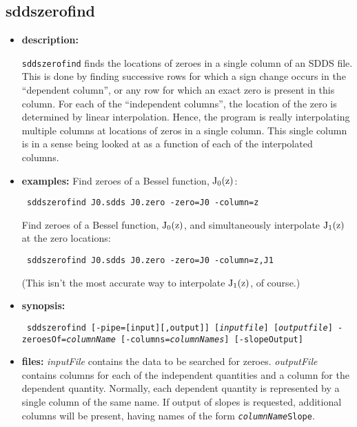 \newpage
\subsection{sddszerofind}
\label{sddszerofind}

\begin{itemize}
\item {\bf description:}

{\tt sddszerofind} finds the locations of zeroes in a single column of an SDDS file.  This is done by finding successive rows
for which a sign change occurs in the ``dependent column'', or any row for which an exact zero is present in this column.  For
each of the ``independent columns'', the location of the zero is determined by linear interpolation.  Hence, the program
is really interpolating multiple columns at locations of zeros in a single column.  This single column is in a sense
being looked at as a function of each of the interpolated columns.

\item {\bf examples:} 
Find zeroes of a Bessel function, ${\rm J_0(z)}$:
\begin{flushleft}{\tt
sddszerofind J0.sdds J0.zero -zero=J0 -column=z
}\end{flushleft}
Find zeroes of a Bessel function, ${\rm J_0(z)}$, and simultaneously interpolate ${\rm J_1(z)}$ at
the zero locations:
\begin{flushleft}{\tt
sddszerofind J0.sdds J0.zero -zero=J0 -column=z,J1
}\end{flushleft}
(This isn't the most accurate way to interpolate ${\rm J_1(z)}$, of course.)

\item {\bf synopsis:} 
\begin{flushleft}{\tt
sddszerofind [-pipe=[input][,output]] [{\em inputfile}] [{\em outputfile}] 
-zeroesOf={\em columnName} [-columns={\em columnNames}] [-slopeOutput]
}\end{flushleft}
\item {\bf files:}
{\em inputFile} contains the data to be searched for zeroes.  {\em outputFile} contains columns for each of the independent
quantities and a column for the dependent quantity.  Normally, each dependent quantity is represented by a single column of
the same name.  If output of slopes is requested, additional columns will be present, having names of the form 
{\tt {\em columnName}Slope}.  


\end{itemize}
